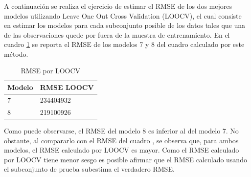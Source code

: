 \documentclass[11pt,a4paper]{article}
\begin{document}
A continuación se realiza el ejercicio de estimar el RMSE de los dos mejores modelos utilizando Leave One Out Cross Validation (LOOCV), el cual consiste en estimar los modelos para cada subconjunto posible de los datos tales que una de las observaciones quede por fuera de la muestra de entrenamiento. En el cuadro \ref{tbl:RMSELOOCV} se reporta el RMSE de los modelos 7 y 8 del cuadro \label{tbl:RMSEearnings} calculado por este método.


\begin{table}[H]
\centering
\caption{RMSE por LOOCV}
\label{tab:rmse_loocv}
\begin{tabular}{@{}ll@{}}
\toprule
Modelo & RMSE LOOCV \\ \midrule
7 & 234404932 \\ 
8 & 219100926 \\ \bottomrule
\end{tabular}
\label{tbl:RMSELOOCV}
\end{table}

Como puede observarse, el RMSE del modelo 8 es inferior al del modelo 7. No obstante, al compararlo con el RMSE del cuadro \label{tbl:RMSEearnings}, se observa que, para ambos modelos, el RMSE calculado por LOOCV es mayor. Como el RMSE calculado por LOOCV tiene menor sesgo es posible afirmar que el RMSE calculado usando el subconjunto de prueba subestima el verdadero RMSE. 




\end{document}
